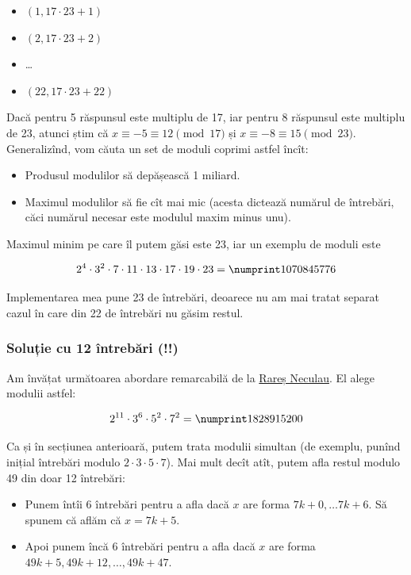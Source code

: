 \documentclass[../main.tex]{subfiles}
\begin{document}
\begin{itemize}
  \item $(1, 17 \cdot 23 + 1)$
  \item $(2, 17 \cdot 23 + 2)$
  \item \dots
  \item $(22, 17 \cdot 23 + 22)$
\end{itemize}

Dacă pentru 5 răspunsul este multiplu de 17, iar pentru 8 răspunsul este multiplu de 23, atunci știm că $x \equiv -5 \equiv 12 \pmod{17}$ și $x \equiv -8 \equiv 15 \pmod{23}$. Generalizînd, vom căuta un set de moduli coprimi astfel încît:

\begin{itemize}
  \item Produsul modulilor să depășească 1 miliard.
  \item Maximul modulilor să fie cît mai mic (acesta dictează numărul de întrebări, căci numărul necesar este modulul maxim minus unu).
\end{itemize}

Maximul minim pe care îl putem găsi este 23, iar un exemplu de moduli este

$$2^4 \cdot 3^2 \cdot 7 \cdot 11 \cdot 13 \cdot 17 \cdot 19 \cdot 23 = \np{1070845776}$$

Implementarea mea pune 23 de întrebări, deoarece nu am mai tratat separat cazul în care din 22 de întrebări nu găsim restul. 

\subsubsection*{Soluție cu 12 întrebări (!!)}

Am învățat următoarea abordare remarcabilă de la \href{https://codeforces.com/contest/1665/submission/290848945}{Rareș Neculau}. El alege modulii astfel:

$$2^{11} \cdot 3^6 \cdot 5^2 \cdot 7^2 = \np{1828915200}$$

Ca și în secțiunea anterioară, putem trata modulii simultan (de exemplu, punînd inițial întrebări modulo $2 \cdot 3 \cdot 5 \cdot 7$). Mai mult decît atît, putem afla restul modulo 49 din doar 12 întrebări:

\begin{itemize}
  \item Punem întîi 6 întrebări pentru a afla dacă $x$ are forma $7k + 0, \dots 7k + 6$. Să spunem că aflăm că $x = 7k + 5$.

  \item Apoi punem încă 6 întrebări pentru a afla dacă $x$ are forma $49k + 5, 49k + 12, \dots, 49k + 47$.
\end{itemize}
\end{document}

